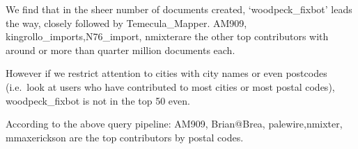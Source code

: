 \documentclass[]{article}
\newenvironment{Shaded}{\begin{snugshade}}{\end{snugshade}}
\newcommand{\DecValTok}[1]{\textcolor[rgb]{0.86,0.86,0.80}{{#1}}}
\newcommand{\StringTok}[1]{\textcolor[rgb]{0.80,0.58,0.58}{{#1}}}
\newcommand{\CommentTok}[1]{\textcolor[rgb]{0.50,0.62,0.50}{{#1}}}
\newcommand{\OtherTok}[1]{\textcolor[rgb]{0.94,0.94,0.56}{{#1}}}
\newcommand{\NormalTok}[1]{\textcolor[rgb]{0.80,0.80,0.80}{{#1}}}
\begin{document}
We find that in the sheer number of documents created,
`woodpeck\_fixbot' leads the way, closely followed by Temecula\_Mapper.
AM909, kingrollo\_imports,N76\_import, nmixterare the other top
contributors with around or more than quarter million documents each.

However if we restrict attention to cities with city names or even
postcodes (i.e.~look at users who have contributed to most cities or
most postal codes), woodpeck\_fixbot is not in the top 50 even.

\begin{Shaded}
\end{Shaded}

According to the above query pipeline: AM909, Brian@Brea,
palewire,nmixter, mmaxerickson are the top contributors by postal codes.

\begin{Shaded}
\end{Shaded}
\end{document}
